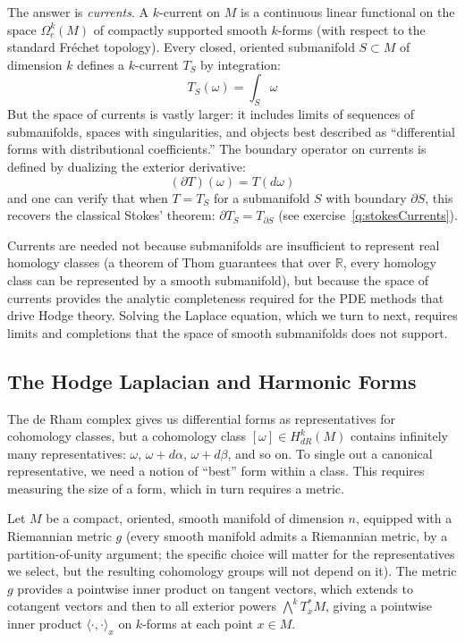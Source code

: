 \documentclass{article}
\newcommand{\R}{\mathbb{R}}
\begin{document}
The answer is \emph{currents}. A $k$-current on $M$ is a continuous linear
functional on the space $\Omega^k_c(M)$ of compactly supported smooth
$k$-forms (with respect to the standard Fr\'{e}chet topology). Every closed,
oriented submanifold $S \subset M$ of dimension $k$ defines a $k$-current
$T_S$ by integration:
\[
  T_S(\omega) = \int_S \omega
\]
But the space of currents is vastly larger: it includes limits of sequences of
submanifolds, spaces with singularities, and objects best described as
``differential forms with distributional coefficients.'' The boundary operator
on currents is defined by dualizing the exterior derivative:
\[
  (\partial T)(\omega) = T(d\omega)
\]
and one can verify that when $T = T_S$ for a submanifold $S$ with boundary
$\partial S$, this recovers the classical Stokes' theorem: $\partial T_S =
T_{\partial S}$ (see exercise~\ref{q:stokesCurrents}).

Currents are needed not because submanifolds are insufficient to represent
real homology classes (a theorem of Thom guarantees that over $\R$, every
homology class can be represented by a smooth submanifold), but because the
space of currents provides the analytic completeness required for the PDE
methods that drive Hodge theory. Solving the Laplace equation, which we turn to
next, requires limits and completions that the space of smooth submanifolds
does not support.


\subsection{The Hodge Laplacian and Harmonic Forms}\label{subsec:laplacian}

The de Rham complex gives us differential forms as representatives for
cohomology classes, but a cohomology class $[\omega] \in H^k_{dR}(M)$ contains
infinitely many representatives: $\omega$, $\omega + d\alpha$,
$\omega + d\beta$, and so on. To single out a canonical representative, we
need a notion of ``best'' form within a class. This requires measuring the size
of a form, which in turn requires a metric.

Let $M$ be a compact, oriented, smooth manifold of dimension $n$, equipped with
a Riemannian metric $g$ (every smooth manifold admits a Riemannian metric, by
a partition-of-unity argument; the specific choice will matter for the
representatives we select, but the resulting cohomology groups will not depend
on it). The metric $g$ provides a pointwise inner product on tangent vectors,
which extends to cotangent vectors and then to all exterior powers
$\bigwedge^k T^*_x M$, giving a pointwise inner product
$\langle \cdot, \cdot \rangle_x$ on $k$-forms at each point $x \in M$.
\end{document}
